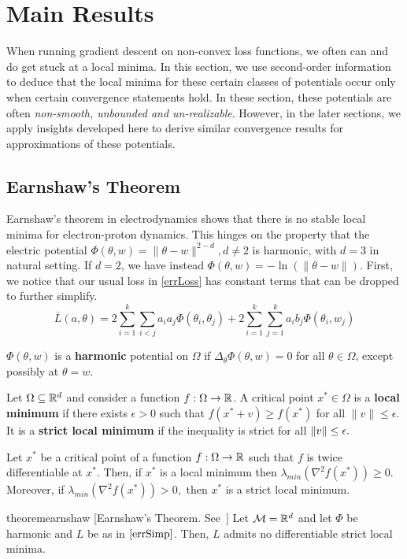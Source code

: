 \section{Main Results} 
%
When running gradient descent on non-convex loss functions, we often
can and do get stuck at a local minima. In this section, we use
second-order information to deduce that the local
minima for these certain classes of potentials occur only when certain convergence statements hold. In these section, these potentials are often {\it non-smooth, unbounded and un-realizable}. However, in the later sections, we apply insights developed here to derive similar convergence results for approximations of these potentials.
%
\subsection{Earnshaw's Theorem}
%
Earnshaw's theorem in electrodynamics shows that there is no stable local minima for electron-proton dynamics. This hinges on the property that the electric potential $\Phi(\theta,w) = \|\theta-w\|^{2-d}, d \neq 2$ is harmonic, with $d = 3$ in natural setting. If $d = 2$, we have instead $\Phi(\theta, w) = - \ln(\|\theta - w\|)$. First, we notice that our usual loss in \eqref{errLoss} has constant terms that can be dropped to further simplify.
%
\begin{equation}\label{errSimp}
\overline{L}(a,\theta) =  2\sum_{i=1}^k\sum_{i < j} a_ia_j\Phi(\theta_i,\theta_j) + 2\sum_{i=1}^k\sum_{j=1}^ka_ib_j \Phi(\theta_i,w_j)
\end{equation} 
%
\begin{definition}
$\Phi(\theta,w)$ is a {\bf harmonic} potential on $\Omega$ if $\Delta_\theta \Phi(\theta,w) = 0$ for all $\theta \in \Omega$, except possibly at $\theta = w$.
\end{definition}

\begin{definition}
  Let $\Omega \subseteq {\mathbb{R}}^d$ and consider a function
  $f:\Omega \to {\mathbb{R}}$. A critical point $x^* \in \Omega$ is a {\bf local
    minimum} if there exists $\epsilon > 0$ such that
  $f(x^*+v) \geq f(x^*)$ for all $\|v\|\leq \epsilon$. It is a {\bf
    strict local minimum} if the inequality is strict for all
  $\left\lVert v \right\rVert \le \epsilon.$
\end{definition} 
%
\begin{fact}
  Let $x^*$ be a critical point of a function $f : \Omega \to {\mathbb{R}}$ such
  that $f$ is twice differentiable at $x^*.$ Then, if $x^*$ is a local
  minimum then $\lambda_{min}(\nabla^2 f(x^*)) \geq 0.$ Moreover, if
  $\lambda_{min}(\nabla^2 f(x^*)) > 0,$ then $x^*$ is a strict local minimum.
\end{fact}
%
\begin{restatable}{theorem}{earnshaw}
[Earnshaw's Theorem. See~\cite{arnold1985mathematical}]
\label{Earnshaw} 
Let $\mathcal{M} = {\mathbb{R}}^d$ and let $\Phi$ be harmonic and $L$
be as in $\eqref{errSimp}$. Then, $L$ admits no
differentiable strict local minima.
\end{restatable}
%


